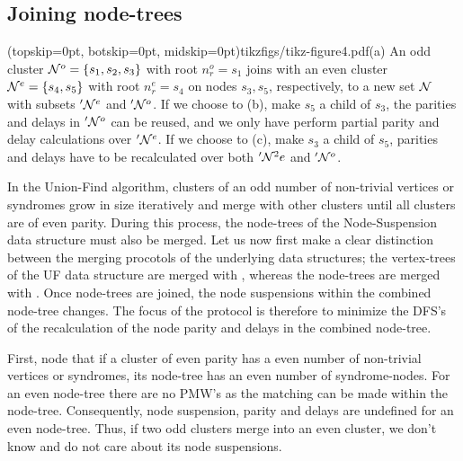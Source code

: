 \subsection{Joining node-trees}\label{sec:nodejoin}

\Figure[htb](topskip=0pt, botskip=0pt, midskip=0pt){tikzfigs/tikz-figure4.pdf}{(a) An odd cluster $\mathcal{N}^o=\{s_1, s_2, s_3\}$ with root $n^o_r = s_1$ joins with an even cluster $\mathcal{N}^e=\{s_4, s_5\}$ with root $n^e_r=s_4$ on nodes $s_3, s_5$, respectively, to a new set $\mathcal{N}$ with subsets $'\mathcal{N}^e$ and $'\mathcal{N}^o$.  If we choose to (b), make $s_5$ a child of $s_3$, the parities and delays in $'\mathcal{N}^o$ can be reused, and we only have perform partial parity and delay calculations over $'\mathcal{N}^e$. If we choose to (c), make $s_3$ a child of $s_5$, parities and delays have to be recalculated over both $'\mathcal{N}^2e$ and $'\mathcal{N}^o$. \label{fig4}}

In the Union-Find algorithm, clusters of an odd number of non-trivial vertices or syndromes grow in size iteratively and merge with other clusters until all clusters are of even parity. During this process, the node-trees of the Node-Suspension data structure must also be merged. Let us now first make a clear distinction between the merging procotols of the underlying data structures; the vertex-trees of the UF data structure are merged with , whereas the node-trees are merged with . Once node-trees are joined, the node suspensions within the combined node-tree changes. The focus of the  protocol is therefore to minimize the DFS's of the recalculation of the node parity and delays in the combined node-tree. 

First, node that if a cluster of even parity has a even number of non-trivial vertices or syndromes, its node-tree has an even number of syndrome-nodes. For an even node-tree there are no PMW's as the matching can be made within the node-tree. Consequently, node suspension, parity and delays are undefined for an even node-tree. Thus, if two odd clusters merge into an even cluster, we don't know and do not care about its node suspensions. 

